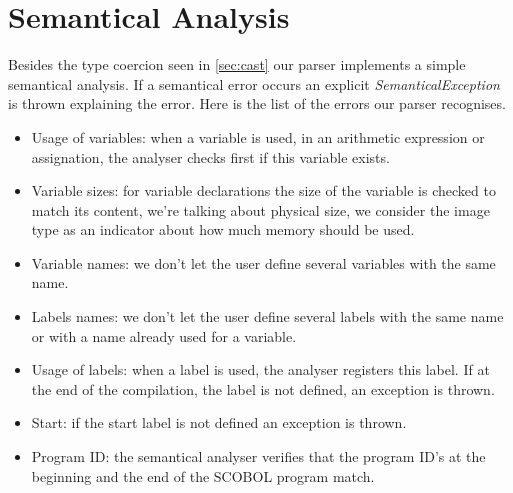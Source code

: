 \section{Semantical Analysis}

Besides the type coercion seen in \ref{sec:cast} our parser implements a simple semantical analysis. If a semantical error occurs an explicit \emph{SemanticalException} is thrown explaining the error. Here is the list of the errors our parser recognises.

\begin{itemize}

\item Usage of variables: when a variable is used, in an arithmetic expression or assignation, the analyser checks first if this variable exists.
\item Variable sizes: for variable declarations the size of the variable is checked to match its content, we're talking about physical size, we consider the image type as an indicator about how much memory should be used.
\item Variable names: we don't let the user define several variables with the same name.
\item Labels names: we don't let the user define several labels with the same name or with a name already used for a variable.
\item Usage of labels: when a label is used, the analyser registers this label. If at the end of the compilation, the label is not defined, an exception is thrown.
\item Start: if the start label is not defined an exception is thrown.
\item Program ID: the semantical analyser verifies that the program ID's at the beginning and the end of the SCOBOL program match.

\end{itemize}



